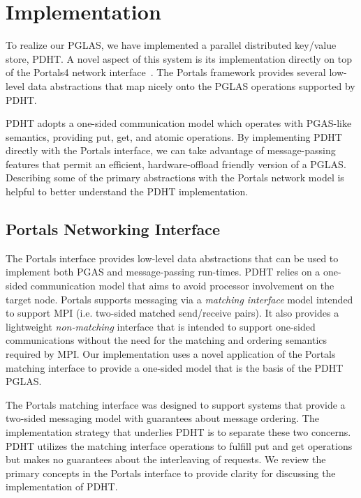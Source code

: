\section{Implementation}

To realize our PGLAS, we have implemented a parallel distributed key/value store, 
PDHT. A novel aspect of this system is its implementation directly on top of the
Portals4 network interface~\cite{portals4}. The Portals framework provides several low-level 
data abstractions that map nicely onto the PGLAS operations supported by PDHT.

PDHT adopts a one-sided communication model which operates with PGAS-like
semantics, providing put, get, and atomic operations. By implementing PDHT directly
with the Portals interface, we can take advantage of message-passing features
that permit an efficient, hardware-offload friendly version of a PGLAS.
Describing some of the primary abstractions with the Portals network model is
helpful to better understand the PDHT implementation.

\subsection{Portals Networking Interface}


The Portals interface provides low-level data abstractions that can be used to
implement both PGAS and message-passing run-times. PDHT relies on a one-sided
communication model that aims to avoid processor involvement on the target
node. Portals supports messaging via a {\em matching interface} model intended to
support MPI (i.e. two-sided matched send/receive pairs). It also provides a
lightweight {\em non-matching} interface that is intended to support one-sided
communications without the need for the matching and ordering semantics
required by MPI. Our implementation uses a novel application of the Portals
matching interface to provide a one-sided model that is the basis of the PDHT
PGLAS. 

The Portals matching interface was designed to support systems that provide a
two-sided messaging model with guarantees about message ordering. The
implementation strategy that underlies PDHT is to separate these two concerns.
PDHT utilizes the matching interface operations to fulfill put and get
operations but makes no guarantees about the interleaving of requests. We
review the primary concepts in the Portals interface to provide clarity for
discussing the implementation of PDHT.



